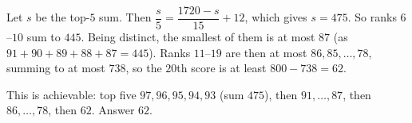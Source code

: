 Let $s$ be the top-$5$ sum. Then $\dfrac s5=\dfrac{1720-s}{15}+12$, which gives $s=475$. So ranks $6$--$10$ sum to $445$. Being distinct, the smallest of them is at most $87$ (as $91+90+89+88+87=445$). Ranks $11$--$19$ are then at most $86,85,\dots,78$, summing to at most $738$, so the $20$th score is at least $800-738=62$.

This is achievable: top five $97,96,95,94,93$ (sum $475$), then $91,\dots,87$, then $86,\dots,78$, then $62$. Answer $\boxed{62}$.
